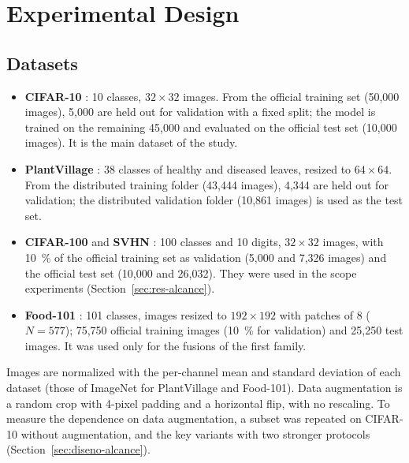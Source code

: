 \section{Experimental Design}
\label{sec:diseno}

\subsection{Datasets}
\begin{itemize}
  \item \textbf{CIFAR-10} \citep{krizhevsky2009learning}: 10 classes, $32\times32$ images. From the official training set (50,000 images), 5,000 are held out for validation with a fixed split; the model is trained on the remaining 45,000 and evaluated on the official test set (10,000 images). It is the main dataset of the study.
  \item \textbf{PlantVillage} \citep{hughes2015plantvillage}: 38 classes of healthy and diseased leaves, resized to $64\times64$. From the distributed training folder (43,444 images), 4,344 are held out for validation; the distributed validation folder (10,861 images) is used as the test set.
  \item \textbf{CIFAR-100} \citep{krizhevsky2009learning} and \textbf{SVHN} \citep{netzer2011reading}: 100 classes and 10 digits, $32\times32$ images, with 10~\% of the official training set as validation (5,000 and 7,326 images) and the official test set (10,000 and 26,032). They were used in the scope experiments (Section~\ref{sec:res-alcance}).
  \item \textbf{Food-101} \citep{bossard2014food}: 101 classes, images resized to $192\times192$ with patches of 8 ($N=577$); 75,750 official training images (10~\% for validation) and 25,250 test images. It was used only for the fusions of the first family.
\end{itemize}
Images are normalized with the per-channel mean and standard deviation of each dataset (those of ImageNet for PlantVillage and Food-101). Data augmentation is a random crop with 4-pixel padding and a horizontal flip, with no rescaling. To measure the dependence on data augmentation, a subset was repeated on CIFAR-10 without augmentation, and the key variants with two stronger protocols (Section~\ref{sec:diseno-alcance}).

